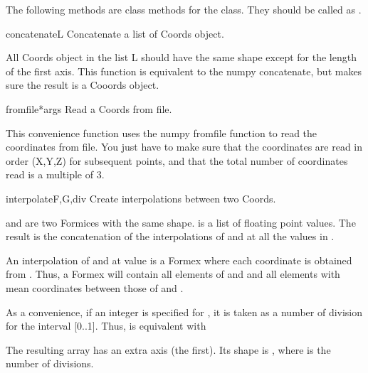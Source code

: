 The following methods are class methods for the  class.
They should be called as .

\begin{methoddesc}{concatenate}{L}
Concatenate a list of Coords object.

 All Coords object in the list L should have the same shape
 except for the length of the first axis.
 This function is equivalent to the numpy concatenate, but makes
 sure the result is a Cooords object.

\classmethod
\end{methoddesc}

\begin{methoddesc}{fromfile}{*args}
Read a Coords from file.

        This convenience function uses the numpy fromfile function to read
        the coordinates from file.
        You just have to make sure that the coordinates are read in order
        (X,Y,Z) for subsequent points, and that the total number of
        coordinates read is a multiple of 3.

\classmethod
\end{methoddesc}


\begin{methoddesc}{interpolate}{F,G,div}
Create interpolations between two Coords.

 and  are two Formices with the same shape.
 is a list of floating point values.
The result is the concatenation of the interpolations of  and  at all the values in .

An interpolation of  and  at value  is a Formex  where each coordinate  is obtained from  .
Thus, a Formex  will contain all elements
of  and  and all elements with mean coordinates between those of  and .

As a convenience, if an integer is specified for , it is taken as a
number of division for the interval [0..1].
Thus,  is equivalent with

The resulting  array has an extra axis (the first). Its shape is
, where  is the number of divisions.

\classmethod
\end{methoddesc}



